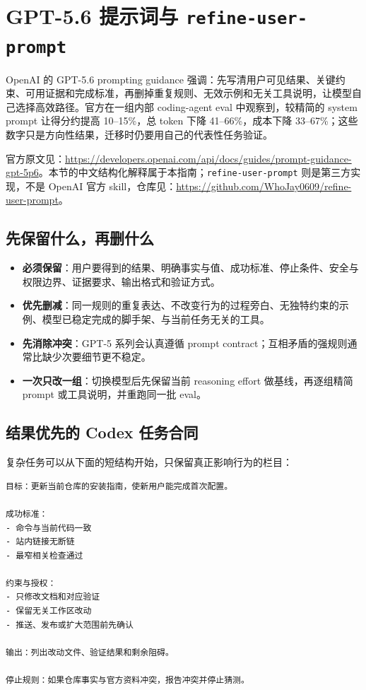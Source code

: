 \documentclass[UTF8,a4paper,11pt,fontset=none]{ctexart}
\newcommand{\skill}[1]{\texttt{#1}}
\newcommand{\keypoint}[1]{\textbf{#1}}
\begin{document}
\section{GPT-5.6 提示词与 \skill{refine-user-prompt}}

OpenAI 的 GPT-5.6 prompting guidance 强调：先写清用户可见结果、关键约束、可用证据和完成标准，再删掉重复规则、无效示例和无关工具说明，让模型自己选择高效路径。官方在一组内部 coding-agent eval 中观察到，较精简的 system prompt 让得分约提高 10--15\%，总 token 下降 41--66\%，成本下降 33--67\%；这些数字只是方向性结果，迁移时仍要用自己的代表性任务验证。

官方原文见：\url{https://developers.openai.com/api/docs/guides/prompt-guidance-gpt-5p6}。本节的中文结构化解释属于本指南；\skill{refine-user-prompt} 则是第三方实现，不是 OpenAI 官方 skill，仓库见：\url{https://github.com/WhoJay0609/refine-user-prompt}。

\subsection{先保留什么，再删什么}

\begin{itemize}
  \item \keypoint{必须保留}：用户要得到的结果、明确事实与值、成功标准、停止条件、安全与权限边界、证据要求、输出格式和验证方式。
  \item \keypoint{优先删减}：同一规则的重复表达、不改变行为的过程旁白、无独特约束的示例、模型已稳定完成的脚手架、与当前任务无关的工具。
  \item \keypoint{先消除冲突}：GPT-5 系列会认真遵循 prompt contract；互相矛盾的强规则通常比缺少次要细节更不稳定。
  \item \keypoint{一次只改一组}：切换模型后先保留当前 reasoning effort 做基线，再逐组精简 prompt 或工具说明，并重跑同一批 eval。
\end{itemize}

\subsection{结果优先的 Codex 任务合同}

复杂任务可以从下面的短结构开始，只保留真正影响行为的栏目：

\begin{lstlisting}
目标：更新当前仓库的安装指南，使新用户能完成首次配置。

成功标准：
- 命令与当前代码一致
- 站内链接无断链
- 最窄相关检查通过

约束与授权：
- 只修改文档和对应验证
- 保留无关工作区改动
- 推送、发布或扩大范围前先确认

输出：列出改动文件、验证结果和剩余阻碍。

停止规则：如果仓库事实与官方资料冲突，报告冲突并停止猜测。
\end{lstlisting}
\end{document}
